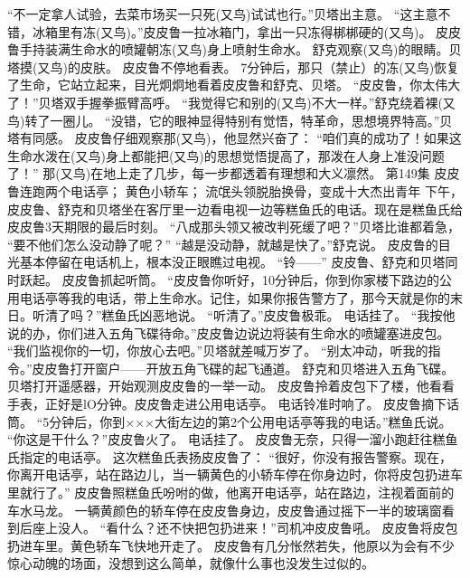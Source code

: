 \documentclass[a4paper,12pt,UTF8,twoside]{ctexbook}
\begin{document}
        “不一定拿人试验，去菜市场买一只死(又鸟)试试也行。”贝塔出主意。 
        “这主意不错，冰箱里有冻(又鸟)。”皮皮鲁一拉冰箱门，拿出一只冻得梆梆硬的(又鸟)。 
        皮皮鲁手持装满生命水的喷罐朝冻(又鸟)身上喷射生命水。 
        舒克观察(又鸟)的眼睛。贝塔摸(又鸟)的皮肤。 
        皮皮鲁不停地看表。 
        7分钟后，那只（禁止）的冻(又鸟)恢复了生命，它站立起来，目光炯炯地看着皮皮鲁和舒克、贝塔。 
        “皮皮鲁，你太伟大了！”贝塔双手握拳振臂高呼。 
        “我觉得它和别的(又鸟)不大一样。”舒克绕着裸(又鸟)转了一圈儿。 
        “没错，它的眼神显得特别有觉悟，特革命，思想境界特高。”贝塔有同感。 
        皮皮鲁仔细观察那(又鸟)，他显然兴奋了：  “咱们真的成功了！如果这生命水泼在(又鸟)身上都能把(又鸟)的思想觉悟提高了，那泼在人身上准没问题了！” 
        那(又鸟)在地上走了几步，每一步都透着有理想和大义凛然。   第149集 
        皮皮鲁连跑两个电话亭； 
        黄色小轿车； 
        流氓头领脱胎换骨，变成十大杰出青年   
        下午，皮皮鲁、舒克和贝塔坐在客厅里一边看电视一边等糕鱼氏的电话。现在是糕鱼氏给皮皮鲁3天期限的最后时刻。 
        “八成那头领又被改判死缓了吧？”贝塔比谁都着急，  “要不他们怎么没动静了呢？” 
        “越是没动静，就越是快了。”舒克说。 
        皮皮鲁的目光基本停留在电话机上，根本没正眼瞧过电视。 
        “铃——” 
        皮皮鲁、舒克和贝塔同时跃起。 
        皮皮鲁抓起听筒。 
        “皮皮鲁你听好，10分钟后，你到你家楼下路边的公用电话亭等我的电话，带上生命水。记住，如果你报告警方了，那今天就是你的末日。听清了吗？”糕鱼氏凶恶地说。 
        “听清了。”皮皮鲁极乖。 
        电话挂了。 
        “我按他说的办，你们进入五角飞碟待命。”皮皮鲁边说边将装有生命水的喷罐塞进皮包。 
        “我们监视你的一切，你放心去吧。”贝塔就差喊万岁了。 
        “别太冲动，听我的指令。”皮皮鲁打开窗户——开放五角飞碟的起飞通道。 
        舒克和贝塔进入五角飞碟。贝塔打开遥感器，开始观测皮皮鲁的一举一动。 
        皮皮鲁拎着皮包下了楼，他看看手表，正好是lO分钟。皮皮鲁走进公用电话亭。 
        电话铃准时响了。 
        皮皮鲁摘下话筒。 
        “5分钟后，你到×××大街左边的第2个公用电话亭等我的电话。”糕鱼氏说。 
        “你这是干什么？”皮皮鲁火了。 
        电话挂了。 
        皮皮鲁无奈，只得一溜小跑赶往糕鱼氏指定的电话亭。 
        这次糕鱼氏表扬皮皮鲁了： 
        “很好，你没有报告警察。现在，你离开电话亭，站在路边儿，当一辆黄色的小轿车停在你身边时，你将皮包扔进车里就行了。” 
        皮皮鲁照糕鱼氏吩咐的做，他离开电话亭，站在路边，注视着面前的车水马龙。 
        一辆黄颜色的轿车停在皮皮鲁身边，皮皮鲁通过摇下一半的玻璃窗看到后座上没人。 
        “看什么？还不快把包扔进来！”司机冲皮皮鲁吼。 
        皮皮鲁将皮包扔进车里。黄色轿车飞快地开走了。 
        皮皮鲁有几分怅然若失，他原以为会有不少惊心动魄的场面，没想到这么简单，就像什么事也没发生过似的。 
\end{document}
